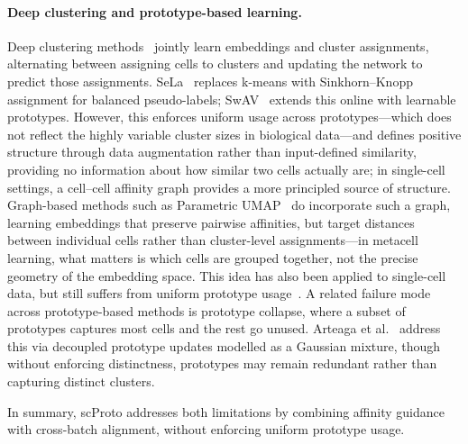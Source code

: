 \paragraph{Deep clustering and prototype-based learning.}
Deep clustering methods~\citep{deepcluster} jointly learn embeddings and cluster assignments, alternating between assigning cells to clusters and updating the network to predict those assignments.
SeLa~\citep{asano2019self} replaces k-means with Sinkhorn--Knopp~\citep{sinkhorn} assignment for balanced pseudo-labels; SwAV~\citep{swav} extends this online with learnable prototypes.
However, this enforces uniform usage across prototypes---which does not reflect the highly variable cluster sizes in biological data---and defines positive structure through data augmentation rather than input-defined similarity, providing no information about how similar two cells actually are; in single-cell settings, a cell--cell affinity graph provides a more principled source of structure.
Graph-based methods such as Parametric UMAP~\citep{parametric_umap} do incorporate such a graph, learning embeddings that preserve pairwise affinities, but target distances between individual cells rather than cluster-level assignments---in metacell learning, what matters is which cells are grouped together, not the precise geometry of the embedding space.
This idea has also been applied to single-cell data, but still suffers from uniform prototype usage~\citep{golpayegani2025interpretable}.
A related failure mode across prototype-based methods is prototype collapse, where a subset of prototypes captures most cells and the rest go unused. Arteaga et al.~\citep{arteaga2026prototypes} address this via decoupled prototype updates modelled as a Gaussian mixture, though without enforcing distinctness, prototypes may remain redundant rather than capturing distinct clusters.

In summary, scProto addresses both limitations by combining affinity guidance with cross-batch alignment, without enforcing uniform prototype usage.
